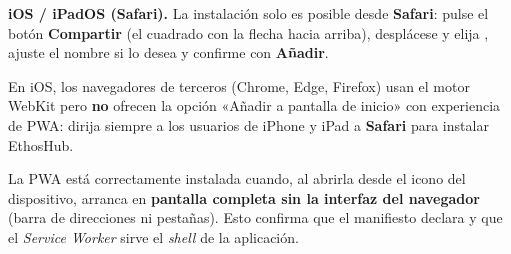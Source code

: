 \textbf{iOS / iPadOS (Safari).} La instalación solo es posible desde \textbf{Safari}: pulse
el botón \textbf{Compartir} (el cuadrado con la flecha hacia arriba), desplácese y elija
, ajuste el nombre si lo desea y confirme con
\textbf{Añadir}.\par

\begin{AvisoPrecaucion}
En iOS, los navegadores de terceros (Chrome, Edge, Firefox) usan el motor WebKit pero
\textbf{no} ofrecen la opción «Añadir a pantalla de inicio» con experiencia de PWA: dirija
siempre a los usuarios de iPhone y iPad a \textbf{Safari} para instalar EthosHub.
\end{AvisoPrecaucion}

\begin{VerificacionOK}
La PWA está correctamente instalada cuando, al abrirla desde el icono del dispositivo,
arranca en \textbf{pantalla completa sin la interfaz del navegador} (barra de direcciones ni
pestañas). Esto confirma que el manifiesto declara  y que el
\textit{Service Worker} sirve el \textit{shell} de la aplicación.
\end{VerificacionOK}
